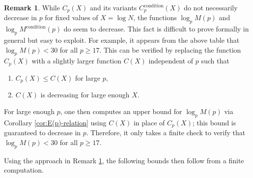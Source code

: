 \documentclass[11pt,letterpaper,reqno]{amsart}
\theoremstyle{definition}
\newtheorem{remark}[theorem]{Remark}
\numberwithin{equation}{section}
\numberwithin{figure}{section}
\numberwithin{table}{section}
\begin{document}
\begin{remark}\label{rmk:C-decreasing-modification}
    While $C_p(X)$ and its variants $C_p^{\text{condition}}(X)$ do not necessarily decrease in $p$ for fixed values of $X= \log N$, the functions $\log_p M(p)$ and $\log_p M^{\text{condition}}(p)$ do seem to decrease. This fact is difficult to prove formally in general but easy to exploit. For example, it appears from the above table that $\log_p M(p)< 30$ for all $p \geq 17.$ This can be verified by replacing the function $C_p(X)$ with a slightly larger function $C(X)$ independent of $p$ such that
    \begin{enumerate}
        \item $C_p(X) \leq C(X)$ for large $p,$
        \item $C(X)$ is decreasing for large enough $X.$
    \end{enumerate}
    For large enough $p$, one then computes an upper bound for $\log_p M(p)$ via Corollary \ref{cor:E(p)-relation} using $C(X)$ in place of $C_p(X)$; this bound is guaranteed to decrease in $p.$ Therefore, it only takes a finite check to verify that $\log_p M(p) < 30$ for all $p \geq 17.$
\end{remark}

Using the approach in Remark \ref{rmk:C-decreasing-modification}, the following bounds then follow from a finite computation.
\end{document}
